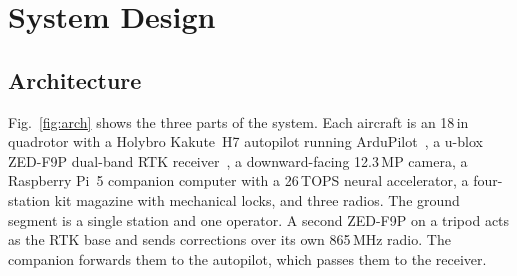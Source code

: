 \documentclass[conference]{IEEEtran}
\begin{document}
\section{System Design}

\subsection{Architecture}

Fig.~\ref{fig:arch} shows the three parts of the system. Each aircraft is an
18\,in quadrotor with a Holybro Kakute~H7 autopilot running
ArduPilot~\cite{ardupilot}, a u-blox ZED-F9P dual-band RTK
receiver~\cite{ubloxzedf9p}, a downward-facing 12.3\,MP camera, a Raspberry Pi~5
companion computer with a 26\,TOPS neural accelerator, a four-station kit
magazine with mechanical locks, and three radios. The ground segment is a single
station and one operator. A second ZED-F9P on a tripod acts as the RTK base and
sends corrections over its own 865\,MHz radio. The companion forwards them to
the autopilot, which passes them to the receiver.
\end{document}
